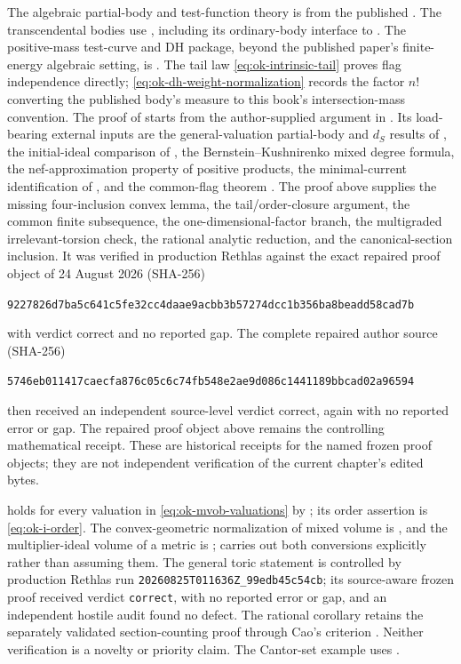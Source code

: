 The algebraic partial-body and test-function theory is from the published
\cite[Sections~3, 5 and~7]{Xia21}.
The transcendental bodies use \cite[Section~10.4]{XiaBook}, including its
ordinary-body interface to \cite{DRWNXZ}.
The positive-mass test-curve and DH package, beyond the published paper's
finite-energy algebraic setting, is \cite[Sections~10.5 and~13.3]{XiaBook}.
The tail law \eqref{eq:ok-intrinsic-tail} proves flag independence directly;
\eqref{eq:ok-dh-weight-normalization} records the factor $n!$ converting
the published body's measure to this book's intersection-mass convention.
The proof of  starts from the author-supplied
argument in \cite{XiaMVOB}.  Its load-bearing external inputs are the
general-valuation partial-body and $d_S$ results of \cite{XiaBook}, the
initial-ideal comparison of \cite{KM19}, the Bernstein--Kushnirenko mixed
degree formula, the nef-approximation property of positive products, the
minimal-current identification of \cite{BEGZ10}, and the common-flag theorem
\cite[Theorem~1.1]{Wil25}.  The proof above supplies the missing
four-inclusion convex lemma, the tail/order-closure argument, the common
finite subsequence, the one-dimensional-factor branch, the multigraded
irrelevant-torsion check, the rational analytic reduction, and the
canonical-section inclusion.  It was verified in production Rethlas against
the exact repaired proof object of 24 August 2026 (SHA-256)
\begin{center}
\small\texttt{9227826d7ba5c641c5fe32cc4daae9acbb3b57274dcc1b356ba8beadd58cad7b}
\end{center}
with verdict correct and no reported gap.
The complete repaired author source (SHA-256)
\begin{center}
\small\texttt{5746eb011417caecfa876c05c6c74fb548e2ae9d086c1441189bbcad02a96594}
\end{center}
then received an independent
source-level verdict correct, again with no reported error or gap.  The
repaired proof object above remains the controlling mathematical receipt.
These are historical receipts for the named frozen proof objects; they are
not independent verification of the current chapter's edited bytes.

 holds for every valuation in
\eqref{eq:ok-mvob-valuations} by \cite[Proposition~10.3.10]{XiaBook}; its
order assertion is \eqref{eq:ok-i-order}.  The convex-geometric normalization
of mixed volume is , and the
multiplier-ideal volume of a metric is
;  carries
out both conversions explicitly rather than assuming them.
The general toric statement  is controlled
by production Rethlas run
\nolinkurl{20260825T011636Z_99edb45c54cb}; its source-aware frozen proof
received verdict \texttt{correct}, with no reported error or gap, and an
independent hostile audit found no defect.  The rational corollary
 retains the separately validated
section-counting proof through Cao's criterion \cite{Cao14}.  Neither
verification is a novelty or priority claim.
The Cantor-set example uses \cite{Car83}.



